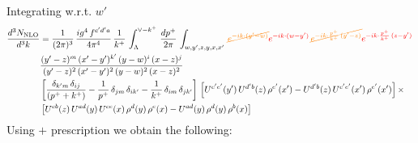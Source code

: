 \documentclass[9pt]{article}
\numberwithin{equation}{section}
\begin{document}
Integrating w.r.t. $w'$
\begin{align}
     \frac{d^{3}N_{\rm NLO}}{d^{3}k} & = \frac{1}{(2\pi)^{3}}\, \frac{ig^{4}\,f^{c'd'a}}{4\pi^{4}}\, \frac{1}{k^{+}}\,\int_{\Lambda}^{\vee-k^{+}}\, \frac{dp^{+}}{2\pi}\, \int_{w,y',z,y,x,x'}\, {\color{orange}\cancel{e^{-ik\cdot (y'-w)}}}{\color{red}e^{-ik\cdot (w-y')}}\, {\color{orange}\cancel{e^{-ik\cdot \frac{p^{+}}{k^{+}}\,(y'-z)}}}{\color{red}e^{-ik\cdot \frac{p^{+}}{k^{+}}\,(z-y')}}\,\notag \\ & \frac{(y'-z)^{m}\,(x'-y')^{k'}\,(y-w)^{i}\,(x-z)^{j}}{(y'-z)^{2}\,(x'-y')^{2}\,(y-w)^{2}\,(x-z)^{2}}\notag \\ & \left[\frac{\delta_{k'm}\,\delta_{ij}}{(p^{+}+k^{+})}-\frac{1}{p^{+}}\,\delta_{jm}\,\delta_{ik'}-\frac{1}{k^{+}}\, \delta_{im}\, \delta_{jk'}\right]\, \left[U^{c'e'}(y')\,U^{d'b}(z)\,\rho^{e'}(x')-U^{d'b}(z)\,U^{c'e'}(x')\,\rho^{e'}(x')\right]\times\notag \\ &  \left[U^{cb}(z)\,U^{ad}(y)\,U^{ce}(x)\,\rho^{d}(y)\,\rho^{e}(x)-U^{ad}(y)\,\rho^{d}(y)\,\rho^{b}(x)\right]
\end{align}
Using $+$ prescription we obtain the following:
\end{document}

